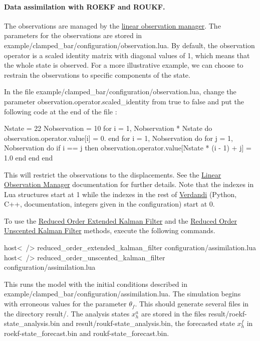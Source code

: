 \documentclass{tufte-book}
\begin{document}
\hypertarget{example_programs_assimilation2}{}\paragraph{\-Data assimilation with R\-O\-E\-K\-F and R\-O\-U\-K\-F.}\label{example_programs_assimilation2}

\-The observations are managed by the \hyperlink{linear_observation_manager}{linear observation manager}. \-The parameters for the observations are stored in {\ttfamily example/clamped\-\_\-bar/configuration/observation.\-lua}. \-By default, the observation operator is a scaled identity matrix with diagonal values of 1, which means that the whole state is observed. \-For a more illustrative example, we can choose to restrain the observations to specific components of the state.

\-In the file {\ttfamily example/clamped\-\_\-bar/configuration/observation.\-lua}, change the parameter {\ttfamily observation.\-operator.\-scaled\-\_\-identity} from {\ttfamily true} to {\ttfamily false} and put the following code at the end of the file \-:
\begin{frame_lua}
Nstate = 22
Nobservation = 10
for i = 1, Nobservation * Nstate do
    observation.operator.value[i] = 0.
end
for i = 1, Nobservation do
    for j = 1, Nobservation do
        if i == j then
            observation.operator.value[Nstate * (i - 1) + j] = 1.0
        end
    end
end
\end{frame_lua}
  \-This will restrict the observations to the displacements. \-See the \hyperlink{linear_observation_manager}{\-Linear \-Observation \-Manager} documentation for further details. \-Note that the indexes in \-Lua structures start at 1 while the indexes in the rest of \hyperlink{namespace_verdandi}{\-Verdandi} (\-Python, \-C++, documentation, integers given in the configuration) start at 0.

\-To use the \hyperlink{reduced_order_extended_kalman_filter}{\-Reduced \-Order \-Extended \-Kalman \-Filter} and the \hyperlink{reduced_order_unscented_kalman_filter}{\-Reduced \-Order \-Unscented \-Kalman \-Filter} methods, execute the following commands.
\begin{frame_bash}
host<~/> reduced_order_extended_kalman_filter configuration/assimilation.lua
host<~/> reduced_order_unscented_kalman_filter configuration/assimilation.lua
\end{frame_bash}
  \-This runs the model with the initial conditions described in {\ttfamily example/clamped\-\_\-bar/configuration/assimilation.\-lua}. \-The simulation begins with erroneous values for the parameter $ \theta_f $. \-This should generate several files in the directory {\ttfamily result/}. \-The analysis states $x^a_h$ are stored in the files {\ttfamily result/roekf-\/state\-\_\-analysis.\-bin} and {\ttfamily result/roukf-\/state\-\_\-analysis.\-bin}, the forecasted state $x^f_h$ in {\ttfamily roekf-\/state\-\_\-forecast.\-bin} and {\ttfamily roukf-\/state\-\_\-forecast.\-bin}.
\end{document}
